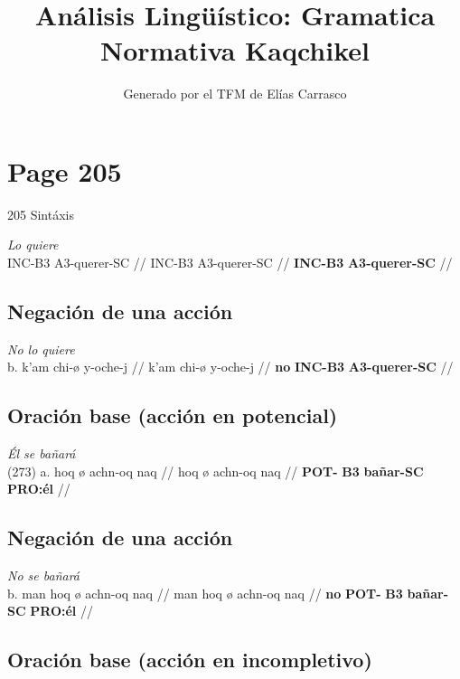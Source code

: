 \documentclass{article}%
\title{Análisis Lingüístico: Gramatica Normativa Kaqchikel}%
\author{Generado por el TFM de Elías Carrasco}%
\begin{document}
%
\normalsize%
\maketitle%
\section{Page 205}%
\label{sec:Page205}%
205 Sintáxis %
\par\medskip%
\ex
\textit{Lo quiere} \\
\begingl
\gla INC-B3 A3-querer-SC //
\glb INC-B3 A3-querer-SC //
\glc \textbf{INC-}\textbf{B3} \textbf{A3-}\textbf{querer}\textbf{-SC} //
\endgl
\xe
%
\medskip%
\subsection{Negación de una acción}%
\label{subsec:Negacindeunaaccin}%

%
\par\medskip%
\ex
\textit{No lo quiere} \\
\begingl
\gla b. k’am chi-ø y-oche-j //
\glb k’am chi-ø y-oche-j //
\glc \textbf{no} \textbf{INC-}\textbf{B3} \textbf{A3-}\textbf{querer}\textbf{-SC} //
\endgl
\xe
%
\medskip%
\subsection{Oración base (acción en potencial)}%
\label{subsec:Oracinbase(accinenpotencial)}%

%
\par\medskip%
\ex
\textit{Él se bañará} \\
\begingl
\gla (273) a. hoq ø achn-oq naq //
\glb hoq ø achn-oq naq //
\glc \textbf{POT-} \textbf{B3} \textbf{bañar-}\textbf{SC} \textbf{PRO:él} //
\endgl
\xe
%
\medskip%
\subsection{Negación de una acción}%
\label{subsec:Negacindeunaaccin}%

%
\par\medskip%
\ex
\textit{No se bañará} \\
\begingl
\gla b. man hoq ø achn-oq naq //
\glb man hoq ø achn-oq naq //
\glc \textbf{no} \textbf{POT-} \textbf{B3} \textbf{bañar-}\textbf{SC} \textbf{PRO:él} //
\endgl
\xe
%
\medskip%
\subsection{Oración base (acción en incompletivo)}%
\label{subsec:Oracinbase(accinenincompletivo)}%
\end{document}
